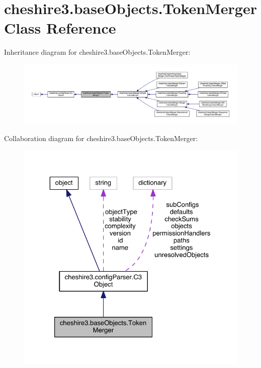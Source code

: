 \hypertarget{classcheshire3_1_1base_objects_1_1_token_merger}{\section{cheshire3.\-base\-Objects.\-Token\-Merger Class Reference}
\label{classcheshire3_1_1base_objects_1_1_token_merger}
}


Inheritance diagram for cheshire3.\-base\-Objects.\-Token\-Merger\-:
\nopagebreak
\begin{figure}[H]
\begin{center}
\leavevmode
\includegraphics[width=350pt]{classcheshire3_1_1base_objects_1_1_token_merger__inherit__graph}
\end{center}
\end{figure}


Collaboration diagram for cheshire3.\-base\-Objects.\-Token\-Merger\-:
\nopagebreak
\begin{figure}[H]
\begin{center}
\leavevmode
\includegraphics[width=325pt]{classcheshire3_1_1base_objects_1_1_token_merger__coll__graph}
\end{center}
\end{figure}
